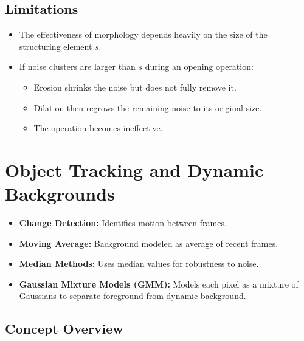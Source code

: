 \documentclass[12pt]{article}
\begin{document}
\subsection{Limitations}
\begin{itemize}
    \item The effectiveness of morphology depends heavily on the size of the structuring element $s$.

    \item If noise clusters are larger than $s$ during an opening operation:
          \begin{itemize}
              \item Erosion shrinks the noise but does not fully remove it.
              \item Dilation then regrows the remaining noise to its original size.
              \item The operation becomes ineffective.
          \end{itemize}
\end{itemize}

\section{Object Tracking and Dynamic Backgrounds}
\begin{itemize}
    \item \textbf{Change Detection:} Identifies motion between frames.
    \item \textbf{Moving Average:} Background modeled as average of recent frames.
    \item \textbf{Median Methods:} Uses median values for robustness to noise.
    \item \textbf{Gaussian Mixture Models (GMM):} Models each pixel as a mixture of Gaussians to separate foreground from dynamic background.
\end{itemize}

\subsection{Concept Overview}
\end{document}
